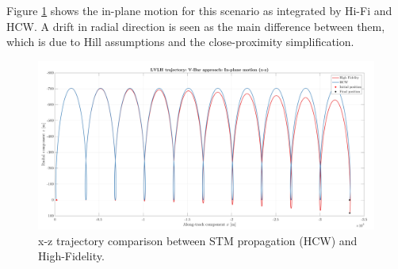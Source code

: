 		\FloatBarrier
		\indent Figure \ref{figCh2:LVLH_V_bar} shows the in-plane motion for this scenario as integrated by Hi-Fi and HCW. A drift in radial direction is seen as the main difference between them, which is due to Hill assumptions and the close-proximity simplification.
		\begin{figure}[!htb]
		\begin{changemargin}{-1.7cm}{-1cm}
		\begin{adjustbox}{width=1.1\textwidth}
		\centering\includegraphics[width = \linewidth]{Chapters/Chapter_02/High_quality/LVLH_trajectory__V_Bar_approach_IP}
		\end{adjustbox}
		\end{changemargin}
		\caption{x-z trajectory comparison between STM propagation (HCW) and High-Fidelity.}
		\label{figCh2:LVLH_V_bar}
		\end{figure}
		\FloatBarrier

